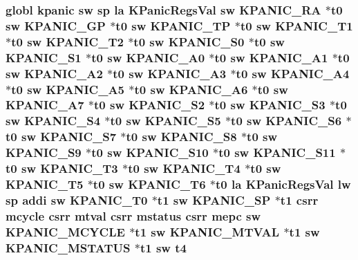 \hypertarget{riscv_2kpanica_8S_a2a1da7be22497563025ccf4565806bf5}{
\subsubsection[{t4}]{\setlength{\rightskip}{0pt plus 5cm}globl {\bf kpanic} {\bf sw} {\bf sp} {\bf la} {\bf K\-Panic\-Regs\-Val} {\bf sw} {\bf K\-P\-A\-N\-I\-C\-\_\-\-R\-A} $\ast${\bf t0} {\bf sw} {\bf K\-P\-A\-N\-I\-C\-\_\-\-G\-P} $\ast${\bf t0} {\bf sw} {\bf K\-P\-A\-N\-I\-C\-\_\-\-T\-P} $\ast${\bf t0} {\bf sw} {\bf K\-P\-A\-N\-I\-C\-\_\-\-T1} $\ast${\bf t0} {\bf sw} {\bf K\-P\-A\-N\-I\-C\-\_\-\-T2} $\ast${\bf t0} {\bf sw} {\bf K\-P\-A\-N\-I\-C\-\_\-\-S0} $\ast${\bf t0} {\bf sw} {\bf K\-P\-A\-N\-I\-C\-\_\-\-S1} $\ast${\bf t0} {\bf sw} {\bf K\-P\-A\-N\-I\-C\-\_\-\-A0} $\ast${\bf t0} {\bf sw} {\bf K\-P\-A\-N\-I\-C\-\_\-\-A1} $\ast${\bf t0} {\bf sw} {\bf K\-P\-A\-N\-I\-C\-\_\-\-A2} $\ast${\bf t0} {\bf sw} {\bf K\-P\-A\-N\-I\-C\-\_\-\-A3} $\ast${\bf t0} {\bf sw} {\bf K\-P\-A\-N\-I\-C\-\_\-\-A4} $\ast${\bf t0} {\bf sw} {\bf K\-P\-A\-N\-I\-C\-\_\-\-A5} $\ast${\bf t0} {\bf sw} {\bf K\-P\-A\-N\-I\-C\-\_\-\-A6} $\ast${\bf t0} {\bf sw} {\bf K\-P\-A\-N\-I\-C\-\_\-\-A7} $\ast${\bf t0} {\bf sw} {\bf K\-P\-A\-N\-I\-C\-\_\-\-S2} $\ast${\bf t0} {\bf sw} {\bf K\-P\-A\-N\-I\-C\-\_\-\-S3} $\ast${\bf t0} {\bf sw} {\bf K\-P\-A\-N\-I\-C\-\_\-\-S4} $\ast${\bf t0} {\bf sw} {\bf K\-P\-A\-N\-I\-C\-\_\-\-S5} $\ast${\bf t0} {\bf sw} {\bf K\-P\-A\-N\-I\-C\-\_\-\-S6} $\ast${\bf t0} {\bf sw} {\bf K\-P\-A\-N\-I\-C\-\_\-\-S7} $\ast${\bf t0} {\bf sw} {\bf K\-P\-A\-N\-I\-C\-\_\-\-S8} $\ast${\bf t0} {\bf sw} {\bf K\-P\-A\-N\-I\-C\-\_\-\-S9} $\ast${\bf t0} {\bf sw} {\bf K\-P\-A\-N\-I\-C\-\_\-\-S10} $\ast${\bf t0} {\bf sw} {\bf K\-P\-A\-N\-I\-C\-\_\-\-S11} $\ast${\bf t0} {\bf sw} {\bf K\-P\-A\-N\-I\-C\-\_\-\-T3} $\ast${\bf t0} {\bf sw} {\bf K\-P\-A\-N\-I\-C\-\_\-\-T4} $\ast${\bf t0} {\bf sw} {\bf K\-P\-A\-N\-I\-C\-\_\-\-T5} $\ast${\bf t0} {\bf sw} {\bf K\-P\-A\-N\-I\-C\-\_\-\-T6} $\ast${\bf t0} {\bf la} {\bf K\-Panic\-Regs\-Val} {\bf lw} {\bf sp} addi {\bf sw} {\bf K\-P\-A\-N\-I\-C\-\_\-\-T0} $\ast${\bf t1} {\bf sw} {\bf K\-P\-A\-N\-I\-C\-\_\-\-S\-P} $\ast${\bf t1} csrr mcycle csrr mtval csrr {\bf mstatus} csrr {\bf mepc} {\bf sw} {\bf K\-P\-A\-N\-I\-C\-\_\-\-M\-C\-Y\-C\-L\-E} $\ast${\bf t1} {\bf sw} {\bf K\-P\-A\-N\-I\-C\-\_\-\-M\-T\-V\-A\-L} $\ast${\bf t1} {\bf sw} {\bf K\-P\-A\-N\-I\-C\-\_\-\-M\-S\-T\-A\-T\-U\-S} $\ast${\bf t1} {\bf sw} t4}}\label{riscv_2kpanica_8S_a2a1da7be22497563025ccf4565806bf5}
